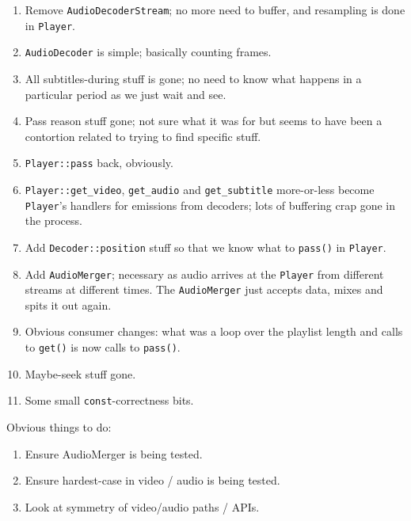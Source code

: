 \documentclass{article}
\begin{document}
\begin{enumerate}
\item Remove \texttt{AudioDecoderStream}; no more need to buffer, and resampling is done in \texttt{Player}.
\item \texttt{AudioDecoder} is simple; basically counting frames.
\item All subtitles-during stuff is gone; no need to know what happens in a particular period as we just wait and see.
\item Pass reason stuff gone; not sure what it was for but seems to have been a contortion related to trying to find specific stuff.
  \item \texttt{Player::pass} back, obviously.
  \item \texttt{Player::get\_video}, \texttt{get\_audio} and
    \texttt{get\_subtitle} more-or-less become \texttt{Player}'s
    handlers for emissions from decoders; lots of buffering crap gone
    in the process.
  \item Add \texttt{Decoder::position} stuff so that we know what to \texttt{pass()} in \texttt{Player}.
  \item Add \texttt{AudioMerger}; necessary as audio arrives at the
    \texttt{Player} from different streams at different times.  The
    \texttt{AudioMerger} just accepts data, mixes and spits it out
    again.
\item Obvious consumer changes: what was a loop over the playlist
  length and calls to \texttt{get()} is now calls to \texttt{pass()}.
  \item Maybe-seek stuff gone.
  \item Some small \texttt{const}-correctness bits.
\end{enumerate}

Obvious things to do:

\begin{enumerate}
\item Ensure AudioMerger is being tested.
\item Ensure hardest-case in video / audio is being tested.
\item Look at symmetry of video/audio paths / APIs.
\end{enumerate}
\end{document}
